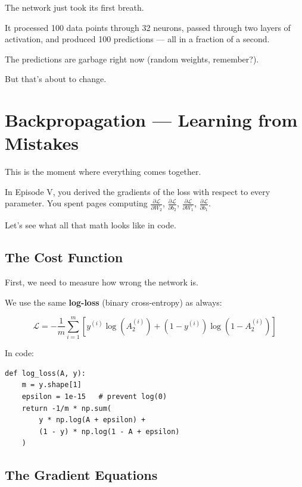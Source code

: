 \documentclass[11pt]{article}
\begin{document}
The network just took its first breath.

It processed 100 data points through 32 neurons, passed through two layers of activation,
and produced 100 predictions --- all in a fraction of a second.

The predictions are garbage right now (random weights, remember?).

But that's about to change.

\section{Backpropagation --- Learning from Mistakes}

This is the moment where everything comes together.

In Episode V, you derived the gradients of the loss with respect to every parameter.
You spent pages computing $\frac{\partial \mathcal{L}}{\partial W_2}$, $\frac{\partial \mathcal{L}}{\partial b_2}$,
$\frac{\partial \mathcal{L}}{\partial W_1}$, $\frac{\partial \mathcal{L}}{\partial b_1}$.

Let's see what all that math looks like in code.

\subsection{The Cost Function}

First, we need to measure how wrong the network is.

We use the same \textbf{log-loss} (binary cross-entropy) as always:

\[
\mathcal{L} = -\frac{1}{m} \sum_{i=1}^{m} \left[ y^{(i)} \log(A_2^{(i)}) + (1 - y^{(i)}) \log(1 - A_2^{(i)}) \right]
\]

In code:

\begin{lstlisting}
def log_loss(A, y):
    m = y.shape[1]
    epsilon = 1e-15   # prevent log(0)
    return -1/m * np.sum(
        y * np.log(A + epsilon) +
        (1 - y) * np.log(1 - A + epsilon)
    )
\end{lstlisting}

\subsection{The Gradient Equations}
\end{document}
